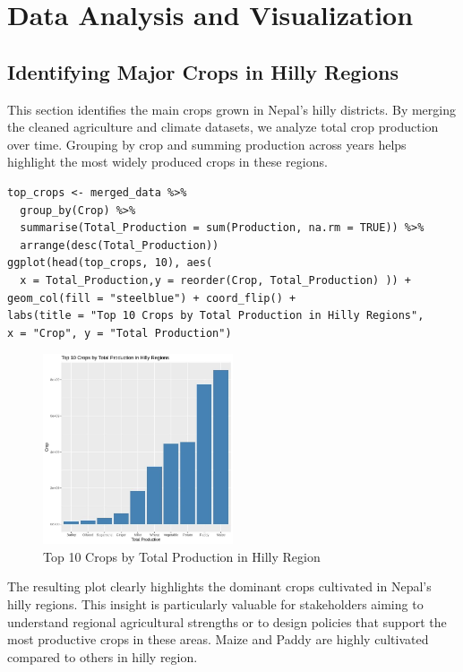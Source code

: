 \section{Data Analysis and Visualization}

\subsection*{Identifying Major Crops in Hilly Regions}

This section identifies the main crops grown in Nepal’s hilly districts. By merging the cleaned agriculture and climate datasets, we analyze total crop production over time. Grouping by crop and summing production across years helps highlight the most widely produced crops in these regions.


\begin{verbatim}
top_crops <- merged_data %>%
  group_by(Crop) %>%
  summarise(Total_Production = sum(Production, na.rm = TRUE)) %>%
  arrange(desc(Total_Production))
ggplot(head(top_crops, 10), aes(
  x = Total_Production,y = reorder(Crop, Total_Production) )) +
geom_col(fill = "steelblue") + coord_flip() +
labs(title = "Top 10 Crops by Total Production in Hilly Regions",
x = "Crop", y = "Total Production")
\end{verbatim}

\begin{figure}[h]
\centering
\includegraphics[width=0.5\textwidth]{figures/bar_agri.jpg}
\caption{ Top 10 Crops by Total Production in Hilly Region}
\end{figure}

The resulting plot clearly highlights the dominant crops cultivated in Nepal’s hilly regions. This insight is particularly valuable for stakeholders aiming to understand regional agricultural strengths or to design policies that support the most productive crops in these areas. Maize and Paddy are highly cultivated compared to others in hilly region.

